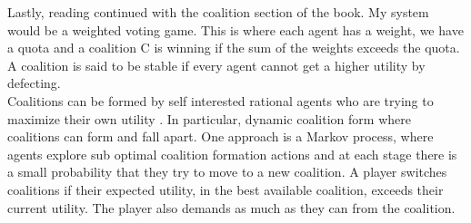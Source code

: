 Lastly, reading continued with the coalition section of the book. My system would be a weighted voting game. This is where each agent has a weight, we have a quota and a coalition C is winning if the sum of the weights exceeds the quota. A coalition is said to be stable if every agent cannot get a higher utility by defecting. \\
Coalitions can be formed by self interested rational agents who are trying to maximize their own utility \citep{Chalkiadakis:2012:pdflatex}. In particular, dynamic coalition form where coalitions can form and fall apart. One approach is a Markov process, where agents explore sub optimal coalition formation actions and at each stage there is a small probability that they try to move to a new coalition. A player switches coalitions if their expected utility, in the best available coalition, exceeds their current utility. The player also demands as much as they can from the coalition.
